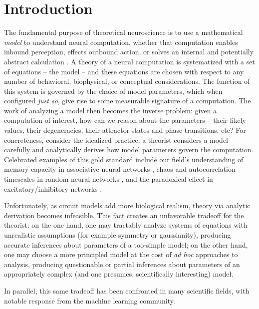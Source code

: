 \documentclass[11pt]{article}
\begin{document}
\section{Introduction}

The fundamental purpose of theoretical neuroscience is to use a mathematical \emph{model} to understand neural computation, whether that computation enables inbound perception, effects outbound action, or solves an internal and potentially abstract calculation \cite{abbott2008theoretical}.  
A theory of a neural computation is systematized with a set of equations -- the model -- and these equations are chosen with respect to any number of behavioral, biophysical, or conceptual considerations.   
The function of this system is governed by the choice of model parameters, which when configured \emph{just so}, give rise to some measurable signature of a computation.   
The work of analyzing a model then becomes the inverse problem: given a computation of interest, how can we reason about the parameters -- their likely values, their degeneracies, their attractor states and phase transitions, etc?  
For concreteness, consider the idealized practice: a theorist considers a model carefully and analytically derives how model parameters govern the computation.  
Celebrated examples of this gold standard include our field's understanding of memory capacity in associative neural networks \cite{hopfield1984neurons}, chaos and autocorrelation timescales in random neural networks \cite{sompolinsky1988chaos}, and the paradoxical effect in excitatory/inhibitory networks \cite{tsodyks1997paradoxical}.  

Unfortunately, as circuit models add more biological realism, theory via analytic derivation becomes infeasible.  
This fact creates an unfavorable tradeoff for the theorist: on the one hand, one may tractably analyze systems of equations with unrealistic assumptions (for example symmetry or gaussianity), producing accurate inferences about parameters of a too-simple model; on the other hand, one may choose a more principled model at the cost of \emph{ad hoc} approaches to analysis, producing questionable or partial inferences about parameters of an appropriately complex (and one presumes, scientifically interesting) model.  %

In parallel, this same tradeoff has been confronted in many scientific fields, with notable response from the machine learning community.  %
\end{document}

